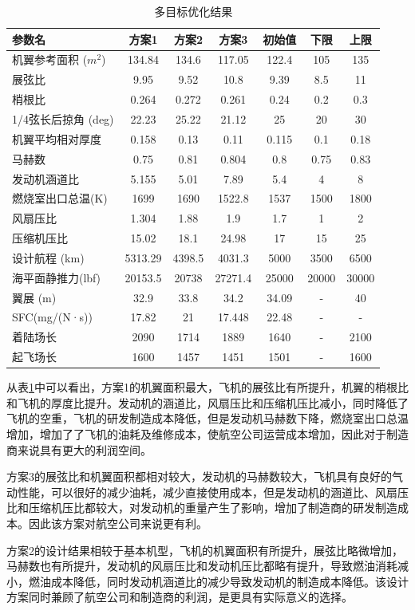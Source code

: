 \documentclass[12pt,a4paper]{report}
\begin{document}
\begin{table}[ht]\centering
\caption{多目标优化结果}
\label{tab:MOO-results}
\begin{tabular}{p{3.9cm}|c|c|c|c|c|c}
\hline \hline
参数名&	方案1&方案2&方案3&初始值&下限&上限\\\hline
机翼参考面积 ($m^2$)& 134.84 & 134.6&117.05&122.4&105 & 135 \\
展弦比&9.95&9.52&10.8&9.39&8.5&11\\
梢根比&0.264&0.272&0.261&0.24&0.2&0.3\\
1/4弦长后掠角 (deg)&22.23&25.22&21.12&25&20&30\\
机翼平均相对厚度&0.158&0.13&0.11&0.115&0.1&0.18\\
马赫数&0.75&0.81&0.804&0.8&0.75&0.83\\
发动机涵道比& 5.155&5.01&7.89&5.4& 4&8\\
燃烧室出口总温(K) & 1699&1690&1522.8&1537& 1500& 1800\\
风扇压比 &1.304 &1.88&1.9&1.7& 1 &2\\
压缩机压比 &15.02&18.1&24.98&17& 15&25 \\
设计航程 (km)&5313.29&4398.5&4031.3&5000&3500&6500\\
海平面静推力(lbf)&20153.5&20738&27271.4&25000&20000&30000\\\hline
翼展 (m) &32.9&33.8&34.2&34.09&-&40\\
SFC(mg/(N·s))&17.82&21&17.448&22.48&-&-\\
着陆场长&2090&1714&1889&1640&-&2100\\
起飞场长&1600&1457&1451&1501&-&1600\\\hline
\hline
\end{tabular}
\end{table}

从表\ref{tab:MOO-results}中可以看出，方案1的机翼面积最大，飞机的展弦比有所提升，机翼的梢根比和飞机的厚度比提升。发动机的涵道比，风扇压比和压缩机压比减小，同时降低了飞机的空重，飞机的研发制造成本降低，但是发动机马赫数下降，燃烧室出口总温增加，增加了了飞机的油耗及维修成本，使航空公司运营成本增加，因此对于制造商来说具有更大的利润空间。

方案3的展弦比和机翼面积都相对较大，发动机的马赫数较大，飞机具有良好的气动性能，可以很好的减少油耗，减少直接使用成本，但是发动机的涵道比、风扇压比和压缩机压比都较大，对发动机的重量产生了影响，增加了制造商的研发制造成本。因此该方案对航空公司来说更有利。

方案2的设计结果相较于基本机型，飞机的机翼面积有所提升，展弦比略微增加，马赫数也有所提升，发动机的风扇压比和发动机压比都略有提升，导致燃油消耗减小，燃油成本降低，同时发动机涵道比的减少导致发动机的制造成本降低。该设计方案同时兼顾了航空公司和制造商的利润，是更具有实际意义的选择。
\end{document}
